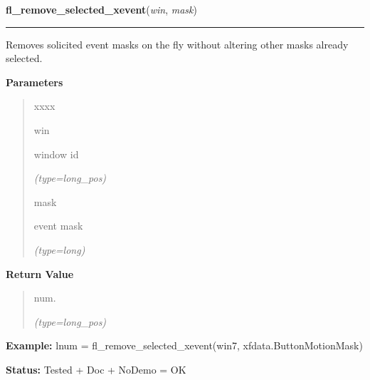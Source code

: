     \vspace{0.5ex}

\hspace{.8\funcindent}\begin{boxedminipage}{\funcwidth}

    \raggedright \textbf{fl\_remove\_selected\_xevent}(\textit{win}, \textit{mask})

    \vspace{-1.5ex}

    \rule{\textwidth}{0.5\fboxrule}
\setlength{\parskip}{2ex}
    Removes solicited event masks on the fly without altering other masks 
    already selected.

\setlength{\parskip}{1ex}
      \textbf{Parameters}
      \vspace{-1ex}

      \begin{quote}
        \begin{Ventry}{xxxx}

          \item[win]

          window id

            {\it (type=long\_pos)}

          \item[mask]

          event mask

            {\it (type=long)}

        \end{Ventry}

      \end{quote}

      \textbf{Return Value}
    \vspace{-1ex}

      \begin{quote}
      num.

      {\it (type=long\_pos)}

      \end{quote}

\textbf{Example:} lnum = fl\_remove\_selected\_xevent(win7, xfdata.ButtonMotionMask)



\textbf{Status:} Tested + Doc + NoDemo = OK



    \end{boxedminipage}

    \label{xformslib:flxbasic:fl_addto_selected_xevent}

